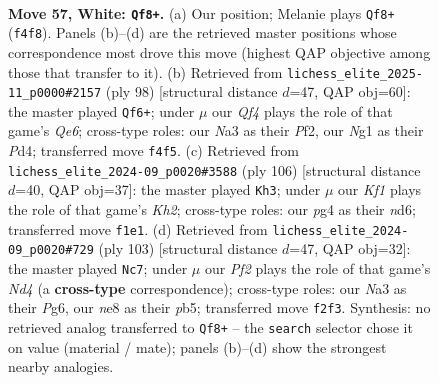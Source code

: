 \documentclass[11pt]{article}
\begin{document}
\clearpage

\begin{figure}[p]\centering
\begin{subfigure}{0.46\textwidth}\centering
\resizebox{\linewidth}{!}{%
\newchessgame
\chessboard[
  setfen={4n2k/8/p3P3/3P3p/5Qpq/Nb6/5P2/5KN1 w - - 3 57},
  showmover=false,
  pgfstyle=straightmove, color=movearrow, markmove={f4-f8}
]}
\caption{}
\end{subfigure}\hfill
\begin{subfigure}{0.46\textwidth}\centering
\resizebox{\linewidth}{!}{%
\newchessgame
\chessboard[
  setfen={5b1k/8/2p1Q3/3p4/3P3P/pq1PP3/5P2/K7 w - - 8 50},
  showmover=false,
  pgfstyle=straightmove, color=movearrow, markmove={e6-f6}
]}
\caption{}
\end{subfigure}
\\[4pt]
\begin{subfigure}{0.46\textwidth}\centering
\resizebox{\linewidth}{!}{%
\newchessgame
\chessboard[
  setfen={8/4Qp1k/3np2p/8/7P/4P1N1/5P1K/3q4 w - - 2 54},
  showmover=false,
  pgfstyle=straightmove, color=movearrow, markmove={h2-h3}
]}
\caption{}
\end{subfigure}\hfill
\begin{subfigure}{0.46\textwidth}\centering
\resizebox{\linewidth}{!}{%
\newchessgame
\chessboard[
  setfen={4k3/1Q6/1p1qP1p1/1P1n1pN1/8/6P1/7K/8 b - - 6 52},
  showmover=false,
  pgfstyle=straightmove, color=movearrow, markmove={d5-c7}
]}
\caption{}
\end{subfigure}
\caption{\textbf{Move 57, White: \texttt{Qf8+}.} (a) Our position; Melanie plays \texttt{Qf8+} (\texttt{f4f8}). Panels (b)--(d) are the retrieved master positions whose correspondence most drove this move (highest QAP objective among those that transfer to it). (b) Retrieved from \texttt{lichess\_elite\_2025-11\_p0000\#2157} (ply 98) [structural distance $d$=47, QAP obj=60]: the master played \texttt{Qf6+}; under $\mu$ our \emph{Qf4} plays the role of that game's \emph{Qe6}; cross-type roles: our \emph{N}a3 as their \emph{P}f2, our \emph{N}g1 as their \emph{P}d4; transferred move \texttt{f4f5}. (c) Retrieved from \texttt{lichess\_elite\_2024-09\_p0020\#3588} (ply 106) [structural distance $d$=40, QAP obj=37]: the master played \texttt{Kh3}; under $\mu$ our \emph{Kf1} plays the role of that game's \emph{Kh2}; cross-type roles: our \emph{p}g4 as their \emph{n}d6; transferred move \texttt{f1e1}. (d) Retrieved from \texttt{lichess\_elite\_2024-09\_p0020\#729} (ply 103) [structural distance $d$=47, QAP obj=32]: the master played \texttt{Nc7}; under $\mu$ our \emph{Pf2} plays the role of that game's \emph{Nd4} (a \textbf{cross-type} correspondence); cross-type roles: our \emph{N}a3 as their \emph{P}g6, our \emph{n}e8 as their \emph{p}b5; transferred move \texttt{f2f3}. Synthesis: no retrieved analog transferred to \texttt{Qf8+} -- the \texttt{search} selector chose it on value (material / mate); panels (b)--(d) show the strongest nearby analogies.}
\label{fig:thought-m112}
\end{figure}
\end{document}
